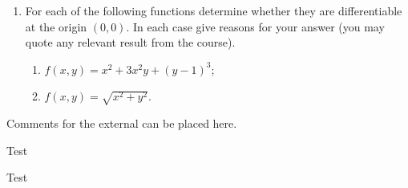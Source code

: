 \documentclass{exams}
\begin{document}
\begin{exam}
\begin{question}
\begin{enumerate}
\item For each of the following functions determine whether they are
differentiable at the origin $(0,0)$. In each case give reasons for your
answer (you may quote any relevant result from the course).

\begin{enumerate}
\item $f(x,y) = x^2 + 3x^2y + (y-1)^3$;
\item $f(x,y) = \sqrt{x^2+y^2}$.
\end{enumerate}
\end{enumerate}
\end{question}
\end{exam}


Comments for the external can be placed here.


\begin{solution}

Test

\end{solution}

\begin{solution}

Test

\end{solution}
\end{document}
